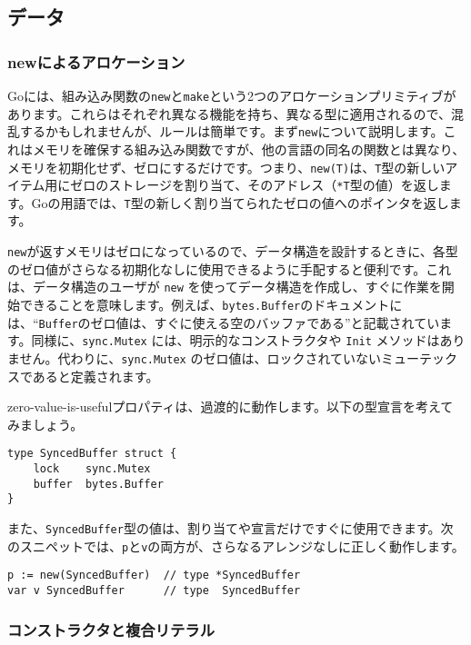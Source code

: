 \documentclass{jsarticle}
\begin{document}
\subsection{データ}

\subsubsection{newによるアロケーション}

Goには、組み込み関数の\texttt{new}と\texttt{make}という2つのアロケーションプリミティブがあります。これらはそれぞれ異なる機能を持ち、異なる型に適用されるので、混乱するかもしれませんが、ルールは簡単です。まず\texttt{new}について説明します。これはメモリを確保する組み込み関数ですが、他の言語の同名の関数とは異なり、メモリを初期化せず、ゼロにするだけです。つまり、\texttt{new(T)}は、\texttt{T}型の新しいアイテム用にゼロのストレージを割り当て、そのアドレス（\texttt{*T}型の値）を返します。Goの用語では、\texttt{T}型の新しく割り当てられたゼロの値へのポインタを返します。

\texttt{new}が返すメモリはゼロになっているので、データ構造を設計するときに、各型のゼロ値がさらなる初期化なしに使用できるように手配すると便利です。これは、データ構造のユーザが
\texttt{new}
を使ってデータ構造を作成し、すぐに作業を開始できることを意味します。例えば、\texttt{bytes.Buffer}のドキュメントには、``\texttt{Buffer}のゼロ値は、すぐに使える空のバッファである''と記載されています。同様に、\texttt{sync.Mutex}
には、明示的なコンストラクタや \texttt{Init}
メソッドはありません。代わりに、\texttt{sync.Mutex}
のゼロ値は、ロックされていないミューテックスであると定義されます。

zero-value-is-usefulプロパティは、過渡的に動作します。以下の型宣言を考えてみましょう。

\begin{lstlisting}[numbers=none]
type SyncedBuffer struct {
    lock    sync.Mutex
    buffer  bytes.Buffer
}
\end{lstlisting}

また、\texttt{SyncedBuffer}型の値は、割り当てや宣言だけですぐに使用できます。次のスニペットでは、\texttt{p}と\texttt{v}の両方が、さらなるアレンジなしに正しく動作します。

\begin{lstlisting}[numbers=none]
p := new(SyncedBuffer)  // type *SyncedBuffer
var v SyncedBuffer      // type  SyncedBuffer
\end{lstlisting}

\subsubsection{コンストラクタと複合リテラル}
\end{document}
